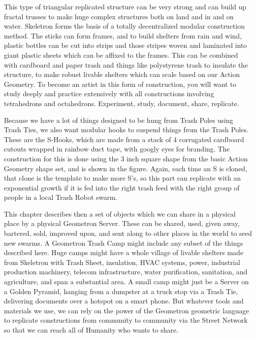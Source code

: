 This type of triangular replicated structure can be very strong and can build up fractal trusses to make huge complex structures both on land and in and on water.  Skeletron forms the basis of a totally decentralized modular construction method.  The sticks can form frames, and to build shelters from rain and wind, plastic bottles can be cut into strips and those stripes woven and laminated into giant plastic sheets which can be affixed to the frames.  This can be combined with cardboard and paper trash and things like polystyrene trash to insulate the structure, to make robust livable shelters which can scale based on our Action Geometry.  To become an artist in this form of construction, you will want to study deeply and practice extensively with all constructions involving tetrahedrons and octahedrons.  Experiment, study, document, share, replicate.  

Because we have a lot of things designed to be hung from Trash Poles using Trash Ties, we also want modular hooks to suspend things from the Trash Poles.  These are the S-Hooks, which are made from a stack of 4 corrugated cardboard cutouts wrapped in rainbow duct tape, with googly eyes for branding.  The construction for this is done using the 3 inch square shape from the basic Action Geometry shape set, and is shown in the figure.  Again, each time an S is cloned, that clone is the template to make more S's, so this part can replicate with an exponential growth if it is fed into the right trash feed with the right group of people in a local Trash Robot swarm.

This chapter describes then a set of objects which we can share in a physical place by a physical Geometron Server.  These can be shared, used, given away, bartered, sold, improved upon, and sent along to other places in the world to seed new swarms.  A Geometron Trash Camp might include any subset of the things described here.  Huge camps might have a whole village of livable shelters made from Skeletron with Trash Sheet, insulation, HVAC systems, power, industrial production machinery, telecom infrastructure, water purification, sanitation, and agriculture, and span a substantial area.  A small camp might just be a Server on a Golden Pyramid, hanging from a dumpster at a truck stop via a Trash Tie, delivering documents over a hotspot on a smart phone.  But whatever tools and materials we use, we can rely on the power of the Geometron geometric language to replicate constructions from community to community via the Street Network so that we can reach all of Humanity who wants to share.

